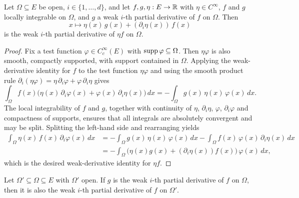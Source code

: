 \begin{lemma}
\label{lem:weak_product_rule}
\leanok
{}
Let $\Omega \subseteq E$ be open, $i \in \{1,\ldots,d\}$, and let $f, g, \eta :
E \to \mathbb{R}$ with $\eta \in C^\infty$, $f$ and $g$ locally integrable on $\Omega$,
and $g$ a weak $i$-th partial derivative of $f$ on $\Omega$. Then
\begin{equation*}
  x \mapsto \eta(x)\,g(x) + (\partial_i \eta(x))\,f(x)
\end{equation*}
is the weak $i$-th partial derivative of $\eta f$ on $\Omega$.
\end{lemma}

\begin{proof}
\leanok

Fix a test function $\varphi \in C_c^\infty(E)$ with $\operatorname{supp}\varphi \subseteq
\Omega$. Then $\eta \varphi$ is also smooth, compactly supported, with support
contained in $\Omega$. Applying the weak-derivative identity for $f$ to the test
function $\eta \varphi$ and using the smooth product rule
$\partial_i(\eta\varphi) = \eta\,\partial_i\varphi + \varphi\,\partial_i\eta$
gives
\begin{equation*}
  \int_\Omega f(x)\bigl(\eta(x)\,\partial_i\varphi(x) + \varphi(x)\,\partial_i\eta(x)\bigr)\,dx
    = -\int_\Omega g(x)\,\eta(x)\,\varphi(x)\,dx.
\end{equation*}
The local integrability of $f$ and $g$, together with continuity of $\eta$,
$\partial_i\eta$, $\varphi$, $\partial_i\varphi$ and compactness of supports,
ensures that all integrals are absolutely convergent and may be split. Splitting
the left-hand side and rearranging yields
\begin{align*}
  \int_\Omega \eta(x)\,f(x)\,\partial_i\varphi(x)\,dx
  &= -\int_\Omega g(x)\,\eta(x)\,\varphi(x)\,dx
     - \int_\Omega f(x)\,\varphi(x)\,\partial_i\eta(x)\,dx \\
  &= -\int_\Omega \bigl(\eta(x)g(x) + (\partial_i\eta(x))f(x)\bigr)\,\varphi(x)\,dx,
\end{align*}
which is the desired weak-derivative identity for $\eta f$.
\end{proof}

\begin{lemma}
\label{lem:weak_restrict}
\leanok
{}
Let $\Omega' \subseteq \Omega \subseteq E$ with $\Omega'$ open. If $g$ is the
weak $i$-th partial derivative of $f$ on $\Omega$, then it is also the weak
$i$-th partial derivative of $f$ on $\Omega'$.
\end{lemma}

